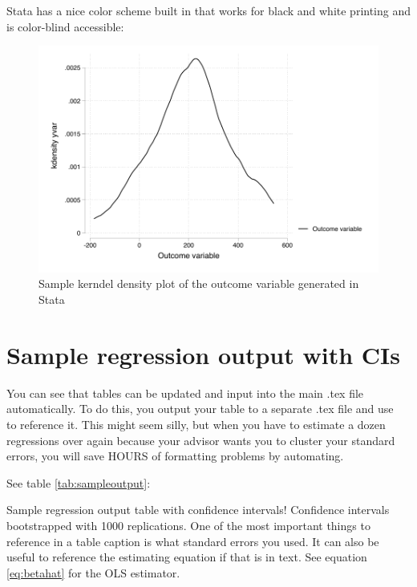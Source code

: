 \documentclass{article}
\begin{document}
Stata has a nice color scheme built in that works for black and white printing and is color-blind accessible:

\begin{figure}[ht]
    \centering
    \includegraphics{statadensity.pdf}
    \caption{Sample kerndel density plot of the outcome variable generated in Stata}
    \label{fig:statahist}
\end{figure}

\section{Sample regression output with CIs}
You can see that tables can be updated and input into the main .tex file automatically.  To do this, you output your table to a separate .tex file and use \verb!  ! to reference it.  This might seem silly, but when you have to estimate a dozen regressions over again because your advisor wants you to cluster your standard errors, you will save HOURS of formatting problems by automating.

See table \ref{tab:sampleoutput}:

\begin{table}[ht]
    \centering
    
    \caption{Sample regression output table with confidence intervals! Confidence intervals bootstrapped with 1000 replications.  One of the most important things to reference in a table caption is what standard errors you used.  It can also be useful to reference the estimating equation if that is in text. See equation \ref{eq:betahat} for the OLS estimator.}
    \label{tab:sampleoutput}
\end{table}
\end{document}
